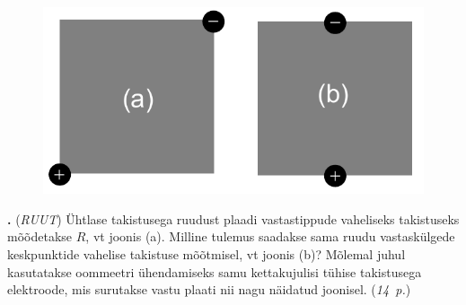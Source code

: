 \documentclass[11pt,a5paper]{article}
\newcommand{\numb}[1]{\vspace{5pt}\textbf{\large #1}}
\newcommand{\nimi}[1]{(\textsl{\small #1})}
\newcommand{\punktid}[1]{(\emph{#1~p.})}
\newcounter{ylesanne}
\newcommand{\yl}[1]{\addtocounter{ylesanne}{1}\numb{\theylesanne.} \nimi{#1} \newblock{}}
\begin{document}
\begin{figure}
  \vspace{-25pt}
  \begin{center}
  \includegraphics[scale=0.44]{kauri-ruut.pdf}
  \end{center}
  \vspace{-25pt}
\end{figure}
\yl{RUUT}
Ühtlase takistusega ruudust plaadi vastastippude vaheliseks takistuseks mõõdetakse
$R$, vt joonis (a). Milline tulemus saadakse sama ruudu vastaskülgede keskpunktide
vahelise takistuse mõõtmisel, vt joonis (b)? Mõlemal juhul kasutatakse oommeetri
ühendamiseks samu kettakujulisi tühise takistusega elektroode, mis surutakse vastu
plaati nii nagu näidatud joonisel.
\punktid{14}
\end{document}
